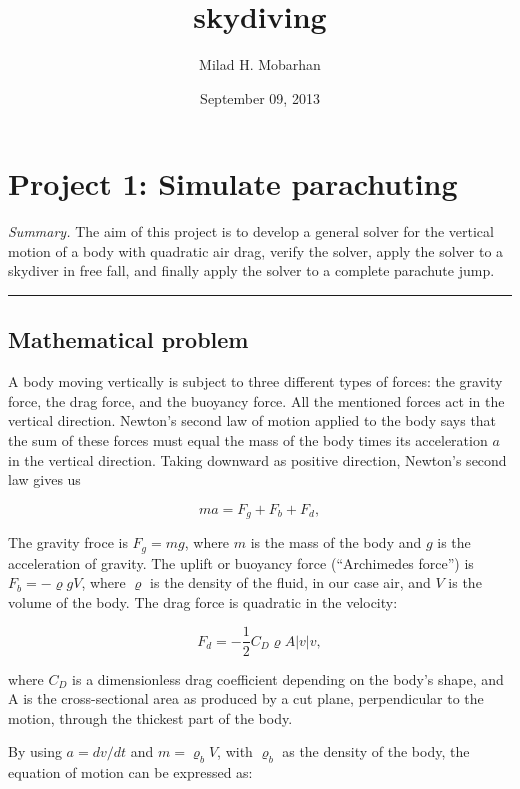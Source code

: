 \documentclass[letterpaper,10pt,english]{/usr/share/sphinx/texinputs/sphinxhowto}
\title{skydiving}
\date{September 09, 2013}
\author{Milad H. Mobarhan}
\begin{document}
        
            \maketitle
        

        


        
        \section{Project 1: Simulate parachuting}

\emph{Summary.} The aim of this project is to develop a general solver
for the vertical motion of a body with quadratic air drag, verify the
solver, apply the solver to a skydiver in free fall, and finally apply
the solver to a complete parachute jump.\begin{center}\rule{3in}{0.4pt}\end{center}

\subsection{Mathematical problem}

A body moving vertically is subject to three different types of forces:
the gravity force, the drag force, and the buoyancy force. All the
mentioned forces act in the vertical direction. Newton's second law of
motion applied to the body says that the sum of these forces must equal
the mass of the body times its acceleration $a$ in the vertical
direction. Taking downward as positive direction, Newton's second law
gives us

\[ma = F_g + F_b + F_d,\]

The gravity froce is $F_g = mg$, where $m$ is the mass of the body and
$g$ is the acceleration of gravity. The uplift or buoyancy force
(``Archimedes force'') is $F_b = -\varrho g V$, where $\varrho$ is the
density of the fluid, in our case air, and $V$ is the volume of the
body. The drag force is quadratic in the velocity:

\[F_d=−\frac{1}{2}C_D\varrho A\vert v\vert v,\]

where $C_D$ is a dimensionless drag coefficient depending on the body's
shape, and A is the cross-sectional area as produced by a cut plane,
perpendicular to the motion, through the thickest part of the body.

By using $a =dv/dt$ and $m =\varrho_bV$, with $\varrho_b$ as the density
of the body, the equation of motion can be expressed as:
\end{document}
